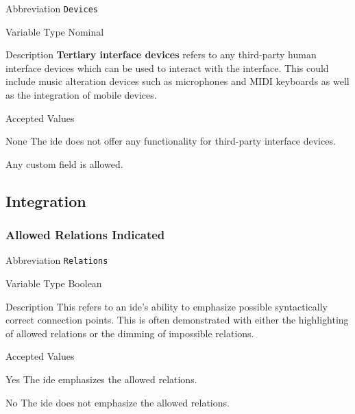 \begin{AlignedDesc}
  \item[Abbreviation] \texttt{Devices}

  \item[Variable Type] Nominal

  \item[Description] \textbf{Tertiary interface devices} refers to any
  third-party human interface devices which can be used to interact with
  the interface.  This could include music alteration devices such as
  microphones and MIDI keyboards as well as the integration of mobile
  devices.

  \item[Accepted Values]

  \begin{AlignedDesc}
    \item[None] The \ac{ide} does not offer any functionality for
    third-party interface devices.
    \item[\textellipsis] Any custom field is allowed.
  \end{AlignedDesc}

\end{AlignedDesc}


\subsection{Integration}
\label{subsec:integration}

\subsubsection{Allowed Relations Indicated}
\label{subsubsec:relations}

\begin{AlignedDesc}
  \item[Abbreviation] \texttt{Relations}

  \item[Variable Type] Boolean

  \item[Description] This refers to an \ac{ide}'s ability to emphasize
  possible syntactically correct connection points. This is often
  demonstrated with either the highlighting of allowed relations or the
  dimming of impossible relations.

  \item[Accepted Values]

  \begin{AlignedDesc}
    \item[Yes] The \ac{ide} emphasizes the allowed relations.
    \item[No] The \ac{ide} does not emphasize the allowed relations.
  \end{AlignedDesc}

\end{AlignedDesc}

